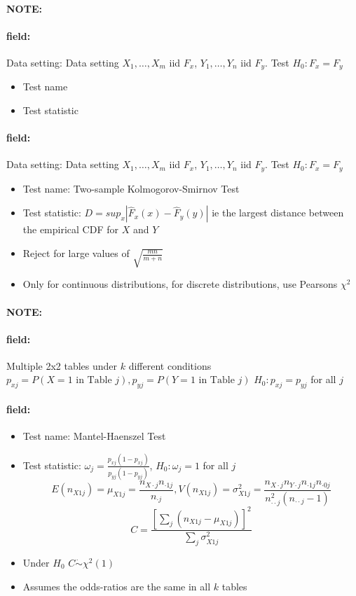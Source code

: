 \documentclass[12pt]{article}
\newenvironment{note}{\paragraph{NOTE:}}{}
\newenvironment{field}{\paragraph{field:}}{}
\begin{document}
\begin{note}
  \begin{field}
    Data setting: Data setting $X_1, \ldots , X_m$ iid $F_x$, $Y_1, \ldots, Y_n$ iid $F_y$. Test $H_0: F_x = F_y$
    \begin{itemize}
      \item Test name
      \item Test statistic

    \end{itemize}
  \end{field}
  \begin{field}
    Data setting: Data setting $X_1, \ldots , X_m$ iid $F_x$, $Y_1, \ldots, Y_n$ iid $F_y$. Test $H_0: F_x = F_y$
    \begin{itemize}
      \item Test name: Two-sample Kolmogorov-Smirnov Test
      \item Test statistic: $D = sup_x|\hat{F}_x(x) - \hat{F}_y(y)|$ ie the largest distance between the empirical CDF for $X$ and $Y$
      \item Reject for large values of $\sqrt{\frac{mn}{m+n}}$
      \item Only for continuous distributions, for discrete distributions, use Pearsons $\chi^2$
    \end{itemize}
  \end{field}
\end{note}

\begin{note}
  \begin{field}
    Multiple 2x2 tables under $k$ different conditions $p_{xj} = P(X = 1 \text{ in Table }j), p_{yj} = P(Y = 1 \text{ in Table }j)$ $H_0: p_{xj} = p_{yj}$ for all $j$
  \end{field}

  \begin{field}
    \begin{itemize}
      \item Test name: Mantel-Haenszel Test
      \item Test statistic: $\omega_j = \frac{p_{xj}(1 - p_{xj})}{p_{yj}(1 - p_{yj})}$, $H_0: \omega_j = 1$ for all $j$
      $$E(n_{X1j}) = \mu_{X1j} = \frac{n_{X\cdot j}n_{\cdot 1 j}}{n_{\cdot j}}, V(n_{X1j}) = \sigma^2_{X1j} = \frac{n_{X\cdot j}n_{Y\cdot j}n_{\cdot 1j} n_{\cdot 0j}}{n^2_{\cdot \cdot j}(n_{\cdot \cdot j} -1)} $$
      $$ C = \frac{[\sum_{j}(n_{X1j} - \mu_{X1j})]^2}{\sum_j \sigma^2_{X1j}}$$
      \item Under $H_0$ $C \dot\sim \chi^2(1)$
      \item Assumes the odds-ratios are the same in all $k$ tables
    \end{itemize}
  \end{field}
\end{note}
\end{document}
